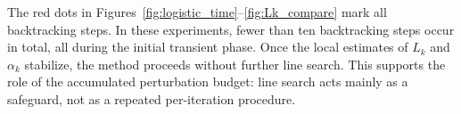 \documentclass{article}
\theoremstyle{plain}
\theoremstyle{definition}
\theoremstyle{remark}
\begin{document}



The red dots in Figures~\ref{fig:logistic_time}--\ref{fig:Lk_compare} mark all backtracking steps. In these experiments, fewer than ten backtracking steps occur in total, all during the initial transient phase. Once the local estimates of $L_k$ and $\alpha_k$ stabilize, the method proceeds without further line search. This supports the role of the accumulated perturbation budget: line search acts mainly as a safeguard, not as a repeated per-iteration procedure.
\end{document}
